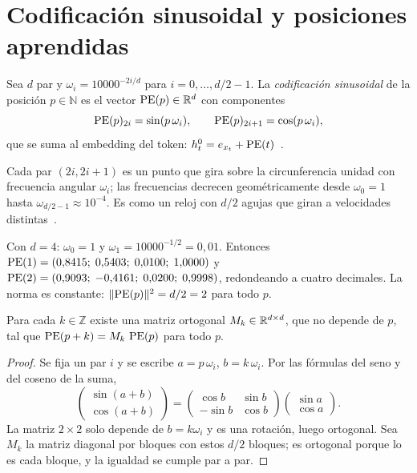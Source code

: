 \section{Codificación sinusoidal y posiciones aprendidas}

\begin{definicion}\label{def:sinusoidal}
Sea $d$ par y $\omega_i=10000^{-2i/d}$ para $i=0,\dots,d/2-1$. La \emph{codificación sinusoidal} de la posición $p\in\mathbb{N}$ es el vector $\operatorname{PE}(p)\in\mathbb{R}^{d}$ con componentes
\[
\operatorname{PE}(p)_{2i}=\sin(p\,\omega_i),\qquad \operatorname{PE}(p)_{2i+1}=\cos(p\,\omega_i),
\]
que se suma al embedding del token: $h^{0}_t=e_{x_t}+\operatorname{PE}(t)$~\cite[§3.5]{vaswani}.
\end{definicion}

Cada par $(2i,2i+1)$ es un punto que gira sobre la circunferencia unidad con frecuencia angular $\omega_i$; las frecuencias decrecen geométricamente desde $\omega_0=1$ hasta $\omega_{d/2-1}\approx 10^{-4}$. Es como un reloj con $d/2$ agujas que giran a velocidades distintas~\cite[§11.6.3.1]{d2l}.

\begin{ejemplo}\label{ej:pe4}
Con $d=4$: $\omega_0=1$ y $\omega_1=10000^{-1/2}=0{,}01$. Entonces $\operatorname{PE}(1)=(0{,}8415;\;0{,}5403;\;0{,}0100;\;1{,}0000)$ y $\operatorname{PE}(2)=(0{,}9093;\;-0{,}4161;\;0{,}0200;\;0{,}9998)$, redondeando a cuatro decimales. La norma es constante: $\lVert\operatorname{PE}(p)\rVert^{2}=d/2=2$ para todo $p$.
\end{ejemplo}

\begin{teorema}\label{teo:desplazamiento}
Para cada $k\in\mathbb{Z}$ existe una matriz ortogonal $M_k\in\mathbb{R}^{d\times d}$, que no depende de $p$, tal que $\operatorname{PE}(p+k)=M_k\,\operatorname{PE}(p)$ para todo $p$.
\end{teorema}

\begin{proof}
Se fija un par $i$ y se escribe $a=p\,\omega_i$, $b=k\,\omega_i$. Por las fórmulas del seno y del coseno de la suma,
\[
\begin{pmatrix}\sin(a+b)\\ \cos(a+b)\end{pmatrix}=\begin{pmatrix}\cos b&\sin b\\ -\sin b&\cos b\end{pmatrix}\begin{pmatrix}\sin a\\ \cos a\end{pmatrix}.
\]
La matriz $2\times 2$ solo depende de $b=k\omega_i$ y es una rotación, luego ortogonal. Sea $M_k$ la matriz diagonal por bloques con estos $d/2$ bloques; es ortogonal porque lo es cada bloque, y la igualdad se cumple par a par.
\end{proof}

